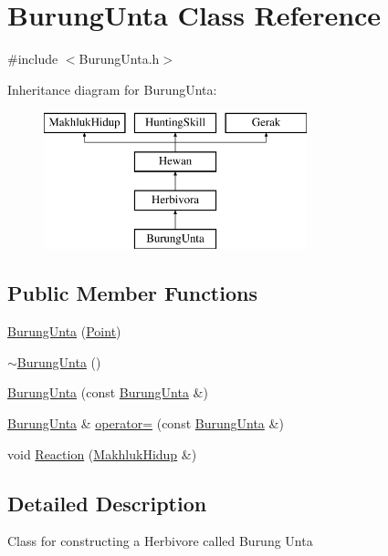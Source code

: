 \hypertarget{class_burung_unta}{}\section{Burung\+Unta Class Reference}
\label{class_burung_unta}


{\ttfamily \#include $<$Burung\+Unta.\+h$>$}

Inheritance diagram for Burung\+Unta\+:\begin{figure}[H]
\begin{center}
\leavevmode
\includegraphics[height=4.000000cm]{class_burung_unta}
\end{center}
\end{figure}
\subsection*{Public Member Functions}
\begin{DoxyCompactItemize}
\item 
\hyperlink{class_burung_unta_a10d7d4828c38563a2f669626b02c901e}{Burung\+Unta} (\hyperlink{class_point}{Point})
\item 
\hyperlink{class_burung_unta_ae61c3065bf3d9b00598bffa003831112}{$\sim$\+Burung\+Unta} ()
\item 
\hyperlink{class_burung_unta_ab15d670ad10668882a8c9f6a549b3a4a}{Burung\+Unta} (const \hyperlink{class_burung_unta}{Burung\+Unta} \&)
\item 
\hyperlink{class_burung_unta}{Burung\+Unta} \& \hyperlink{class_burung_unta_a063db2b2f72bc2832b616c5aeaab0553}{operator=} (const \hyperlink{class_burung_unta}{Burung\+Unta} \&)
\item 
void \hyperlink{class_burung_unta_afbf850167abdb1d2912284cccb497c13}{Reaction} (\hyperlink{class_makhluk_hidup}{Makhluk\+Hidup} \&)
\end{DoxyCompactItemize}


\subsection{Detailed Description}
Class for constructing a Herbivore called Burung Unta 

